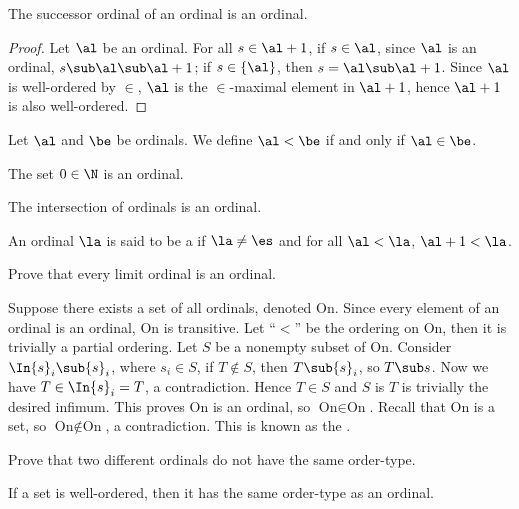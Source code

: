 \documentclass[10pt]{article}
\begin{document}
\begin{proposition}
    The successor ordinal of an ordinal is an ordinal.
\end{proposition}
\begin{proof}
    Let $\al$ be an ordinal. For all $s\in\al+1$, if $s\in\al$, since $\al$ is an ordinal, $s\sub\al\sub\al+1$; if $s\in\{\al\}$, then $s=\al\sub\al+1$. Since $\al$ is well-ordered by $\in$, $\al$ is the $\in$-maximal element in $\al+1$, hence $\al+1$ is also well-ordered.
\end{proof}
\par
Let $\al$ and $\be$ be ordinals. We define $\al<\be$ if and only if $\al\in\be$.
\begin{example}
    The set $0\in\N$ is an ordinal.
\end{example}
\begin{problem}
    The intersection of ordinals is an ordinal.
\end{problem}
\begin{adefinition}
    An ordinal $\la$ is said to be a  if $\la\ne\es$ and for all $\al<\la$, $\al+1<\la$.
\end{adefinition}
\begin{problem}
    Prove that every limit ordinal is an ordinal.
\end{problem}
\par
Suppose there exists a set of all ordinals, denoted $\text{On}$. Since every element of an ordinal is an ordinal, $\text{On}$ is transitive. Let ``$<$'' be the ordering on $\text{On}$, then it is trivially a partial ordering. Let $S$ be a nonempty subset of $\text{On}$. Consider $\In{s}_{i}\sub{s}_{i}$, where ${s}_{i}\in S$, if $T\notin S$, then $T\sub{s}_{i}$, so $T\sub s$. Now we have $T\in\In{s}_{i}=T$, a contradiction. Hence $T\in S$ and $S$ is $T$ is trivially the desired infimum. This proves $\text{On}$ is an ordinal, so $\text{On}\in\text{On}$. Recall that $\text{On}$ is a set, so $\text{On}\notin\text{On}$, a contradiction. This is known as the .
\begin{problem}
    Prove that two different ordinals do not have the same order-type.
\end{problem}
\begin{proposition}
    If a set is well-ordered, then it has the same order-type as an ordinal.
\end{proposition}
\end{document}
